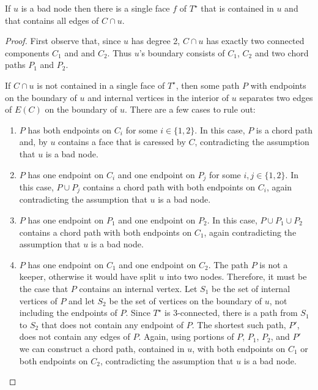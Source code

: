 \documentclass{patmorin}
\newcommand{\dual}[1]{{#1}^\star}
\begin{document}
\begin{lem}
   If $u$ is a bad node then there is a single face $f$ of $\dual{T}$
   that is contained in $u$ and that contains all edges of $C\cap u$.
\end{lem}

\begin{proof}
   First observe that, since $u$ has degree 2, $C\cap u$ has exactly
   two connected components $C_1$ and and $C_2$. Thus $u$'s boundary
   consists of $C_1$, $C_2$ and two chord paths $P_1$ and $P_2$.

   If $C\cap u$ is not contained in a single face of $\dual{T}$, then
   some path $P$ with endpoints on the boundary of $u$ and internal
   vertices in the interior of $u$ separates two edges of $E(C)$ on the
   boundary of $u$.  There are a few cases to rule out:
   \begin{enumerate}
       \item $P$ has both endpoints on $C_i$ for some $i\in\{1,2\}$. In
       this case, $P$ is a chord path and, by 
       $u$ contains a face that is caressed by $C$, contradicting the
       assumption that $u$ is a bad node.

       \item $P$ has one endpoint on $C_i$ and one endpoint on $P_j$
       for some $i,j\in\{1,2\}$.  In this case, $P\cup P_j$ contains a
       chord path with both endpoints on $C_i$, again contradicting the
       assumption that $u$ is a bad node.

       \item $P$ has one endpoint on $P_1$ and one endpoint on $P_2$.
       In this case, $P\cup P_1\cup P_2$ contains a chord path with both
       endpoints on $C_1$, again contradicting the assumption that $u$
       is a bad node.

       \item $P$ has one endpoint on $C_1$ and one endpoint on $C_2$.
       The path $P$ is not a keeper, otherwise it would have split $u$
       into two nodes.	Therefore, it must be the case that $P$ contains
       an internal vertex.  Let $S_1$ be the set of internal vertices
       of $P$ and let $S_2$ be the set of vertices on the boundary
       of $u$, not including the endpoints of $P$.  Since $\dual{T}$
       is 3-connected, there is a path from $S_1$ to $S_2$ that does
       not contain any endpoint of $P$.  The shortest such path, $P'$,
       does not contain any edges of $P$.  Again, using portions of $P$,
       $P_1$, $P_2$, and $P'$ we can construct a chord path, contained
       in $u$, with both endpoints on $C_1$ or both endpoints on $C_2$,
       contradicting the assumption that $u$ is a bad node.
\end{enumerate}
\end{proof}
\end{document}
